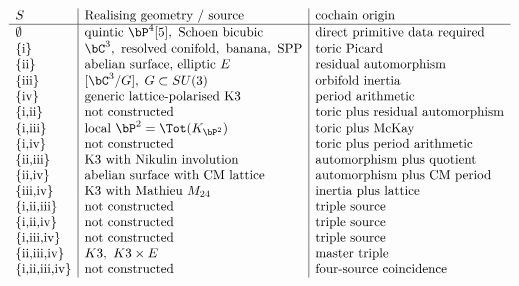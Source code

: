 \begin{example}
\label{ex:stratum-occupancy}
\[
\begin{array}{l|l|l}
 S & \text{Realising geometry / source} &
 \text{cochain origin} \\\hline
 \emptyset & \text{quintic } \bP^4[5],\ \text{Schoen bicubic} &
 \text{direct primitive data required} \\
 \{\text{i}\} & \bC^3,\ \text{resolved conifold},\ \text{banana},\ \text{SPP} &
 \text{toric Picard} \\
 \{\text{ii}\} & \text{abelian surface, elliptic }E &
 \text{residual automorphism} \\
 \{\text{iii}\} & [\bC^3/G],\; G\subset SU(3) &
 \text{orbifold inertia} \\
 \{\text{iv}\} & \text{generic lattice-polarised K3} &
 \text{period arithmetic} \\
 \{\text{i,ii}\} & \text{not constructed} &
 \text{toric plus residual automorphism} \\
 \{\text{i,iii}\} & \text{local } \bP^2=\Tot(K_{\bP^2}) &
 \text{toric plus McKay} \\
 \{\text{i,iv}\} & \text{not constructed} &
 \text{toric plus period arithmetic} \\
 \{\text{ii,iii}\} & \text{K3 with Nikulin involution} &
 \text{automorphism plus quotient} \\
 \{\text{ii,iv}\} & \text{abelian surface with CM lattice} &
 \text{automorphism plus CM period} \\
 \{\text{iii,iv}\} & \text{K3 with Mathieu }M_{24} &
 \text{inertia plus lattice} \\
 \{\text{i,ii,iii}\} & \text{not constructed} &
 \text{triple source} \\
 \{\text{i,ii,iv}\} & \text{not constructed} &
 \text{triple source} \\
 \{\text{i,iii,iv}\} & \text{not constructed} &
 \text{triple source} \\
 \{\text{ii,iii,iv}\} & K3,\ K3\times E &
 \text{master triple} \\
 \{\text{i,ii,iii,iv}\} & \text{not constructed} &
 \text{four-source coincidence}
\end{array}
\]
\end{example}

